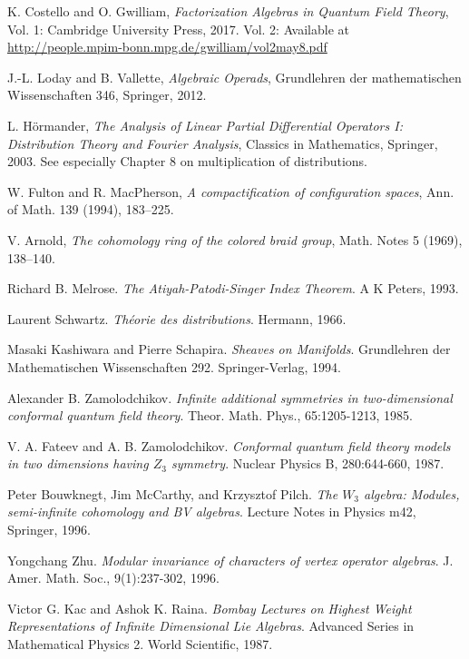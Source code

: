 \begin{thebibliography}{99}
 K. Costello and O. Gwilliam,
\emph{Factorization Algebras in Quantum Field Theory},
Vol. 1: Cambridge University Press, 2017.
Vol. 2: Available at \url{http://people.mpim-bonn.mpg.de/gwilliam/vol2may8.pdf}

 J.-L. Loday and B. Vallette,
\emph{Algebraic Operads},
Grundlehren der mathematischen Wissenschaften 346, Springer, 2012.

 L. Hörmander,
\emph{The Analysis of Linear Partial Differential Operators I: Distribution Theory and Fourier Analysis},
Classics in Mathematics, Springer, 2003.
See especially Chapter 8 on multiplication of distributions.

 W. Fulton and R. MacPherson,
\emph{A compactification of configuration spaces},
Ann. of Math. 139 (1994), 183--225.

 V. Arnold,
\emph{The cohomology ring of the colored braid group},
Math. Notes 5 (1969), 138--140.

Richard B. Melrose.
\textit{The Atiyah-Patodi-Singer Index Theorem}.
A K Peters, 1993.

Laurent Schwartz.
\textit{Théorie des distributions}.
Hermann, 1966.

Masaki Kashiwara and Pierre Schapira.
\textit{Sheaves on Manifolds}.
Grundlehren der Mathematischen Wissenschaften 292.
Springer-Verlag, 1994.

Alexander B. Zamolodchikov.
\textit{Infinite additional symmetries in two-dimensional conformal quantum field theory}.
Theor. Math. Phys., 65:1205-1213, 1985.

V. A. Fateev and A. B. Zamolodchikov.
\textit{Conformal quantum field theory models in two dimensions having $Z_3$ symmetry}.
Nuclear Physics B, 280:644-660, 1987.

Peter Bouwknegt, Jim McCarthy, and Krzysztof Pilch.
\textit{The $W_3$ algebra: Modules, semi-infinite cohomology and BV algebras}.
Lecture Notes in Physics m42, Springer, 1996.

Yongchang Zhu.
\textit{Modular invariance of characters of vertex operator algebras}.
J. Amer. Math. Soc., 9(1):237-302, 1996.

Victor G. Kac and Ashok K. Raina.
\textit{Bombay Lectures on Highest Weight Representations of Infinite Dimensional Lie Algebras}.
Advanced Series in Mathematical Physics 2.
World Scientific, 1987.


\end{thebibliography}
